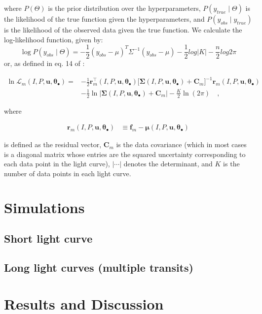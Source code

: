 \documentclass[twocolumn]{aastex631}
\begin{document}
where $P(\Theta)$ is the prior distribution over the hyperparameters, $P(y_{true} \mid \Theta)$ is the likelihood of the true function given the hyperparameters, and $P(y_{obs} \mid y_{true})$ is the likelihood of the observed data given the true function.
We calculate the log-likelihood function, given by:
\begin{equation}
    \log{P(y_{obs} \mid \Theta)} = -\frac{1}{2} (y_{obs} - \mu)^T \Sigma^{-1} (y_{obs} - \mu) -\frac{1}{2} log |K| - \frac{n}{2} log 2\pi
\end{equation}
or, as defined in eq. 14 of \citep{Luger2021}:
\begin{linenomath}\begin{align}
    \label{eq:log-like}
    \ln \mathcal{L}_m\left(I, P, \mathbf{u}, \pmb{\theta}_\bullet\right)
    =
     & -\frac{1}{2}
    \mathbf{r}_m^\top\left(I, P, \mathbf{u}, \pmb{\theta}_\bullet\right)
    \big[
        \pmb{\Sigma}\left(I, P, \mathbf{u}, \pmb{\theta}_\bullet\right)
        +
        \mathbf{C}_m
        \big]^{-1}
    \mathbf{r}_m\left(I, P, \mathbf{u}, \pmb{\theta}_\bullet\right)
    \nonumber       \\[0.75em]
     & -
    \frac{1}{2}
    \ln \Big|
    \pmb{\Sigma}\left(I, P, \mathbf{u}, \pmb{\theta}_\bullet\right)
    +
    \mathbf{C}_m
    \Big|
    -
    \frac{K}{2}
    \ln \left( 2 \pi \right)
    \quad,
\end{align}\end{linenomath}
where
%
\begin{linenomath}\begin{align}
        \mathbf{r}_m\left(I, P, \mathbf{u}, \pmb{\theta}_\bullet\right)
         & \equiv
        \mathbf{f}_m - \pmb{\mu}\left(I, P, \mathbf{u}, \pmb{\theta}_\bullet\right)
    \end{align}\end{linenomath}
%
is defined as the residual vector,
%
$\mathbf{C}_m$ is the data covariance
(which in most cases is a diagonal matrix whose entries
are the squared uncertainty corresponding to each data point in the light curve),
%
$| \cdots |$ denotes the determinant, and $K$ is the number of data points in
each light curve.%

\section{Simulations}
\subsection{Short light curve}
\subsection{Long light curves (multiple transits)}
\section{Results and Discussion}


\end{document}
